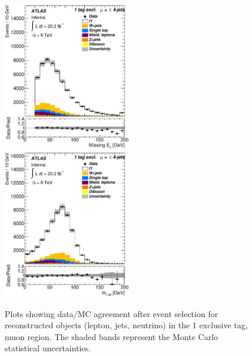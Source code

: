 \begin{figure}[!hb]
\begin{center}
		\includegraphics[height=65mm]{chapters/whel/figures/control_Plots2/bTag_1excl/MissingEt_mu}
        \includegraphics[height=65mm]{chapters/whel/figures/control_Plots2/bTag_1excl/TransverseMass_mu}
	\caption{Plots showing data/MC agreement after event selection for reconstructed objects (lepton, jets, neutrino) in the 1 exclusive \bt tag, muon region. The shaded bands represent the Monte Carlo statistical uncertainties.}
	\label{fig:control_plots_mu_1excl}
	\end{center}
	\end{figure}
	
